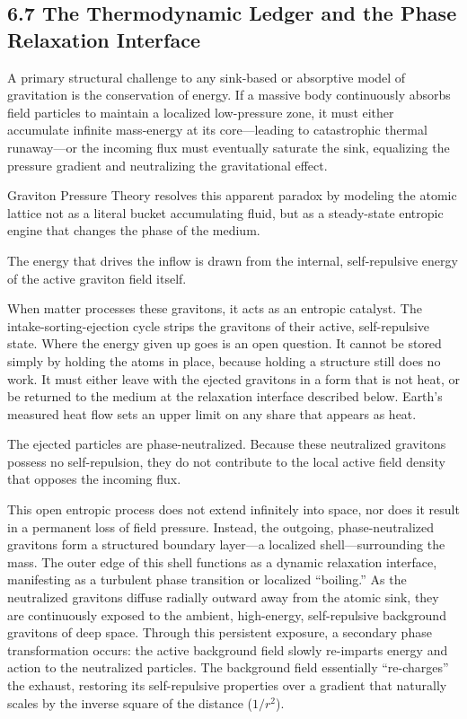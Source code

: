 \documentclass[11pt]{article}
\begin{document}
\subsection{6.7 The Thermodynamic Ledger and the Phase Relaxation Interface}

A primary structural challenge to any sink-based or absorptive model of gravitation is the conservation of energy. If a massive body continuously absorbs field particles to maintain a localized low-pressure zone, it must either accumulate infinite mass-energy at its core---leading to catastrophic thermal runaway---or the incoming flux must eventually saturate the sink, equalizing the pressure gradient and neutralizing the gravitational effect.

Graviton Pressure Theory resolves this apparent paradox by modeling the atomic lattice not as a literal bucket accumulating fluid, but as a steady-state entropic engine that changes the phase of the medium.

The energy that drives the inflow is drawn from the internal, self-repulsive energy of the active graviton field itself.

When matter processes these gravitons, it acts as an entropic catalyst. The intake-sorting-ejection cycle strips the gravitons of their active, self-repulsive state. Where the energy given up goes is an open question. It cannot be stored simply by holding the atoms in place, because holding a structure still does no work. It must either leave with the ejected gravitons in a form that is not heat, or be returned to the medium at the relaxation interface described below. Earth's measured heat flow sets an upper limit on any share that appears as heat.

The ejected particles are phase-neutralized. Because these neutralized gravitons possess no self-repulsion, they do not contribute to the local active field density that opposes the incoming flux.

This open entropic process does not extend infinitely into space, nor does it result in a permanent loss of field pressure. Instead, the outgoing, phase-neutralized gravitons form a structured boundary layer---a localized shell---surrounding the mass. The outer edge of this shell functions as a dynamic relaxation interface, manifesting as a turbulent phase transition or localized ``boiling.'' As the neutralized gravitons diffuse radially outward away from the atomic sink, they are continuously exposed to the ambient, high-energy, self-repulsive background gravitons of deep space. Through this persistent exposure, a secondary phase transformation occurs: the active background field slowly re-imparts energy and action to the neutralized particles. The background field essentially ``re-charges'' the exhaust, restoring its self-repulsive properties over a gradient that naturally scales by the inverse square of the distance (\(1/r^2\)).
\end{document}

